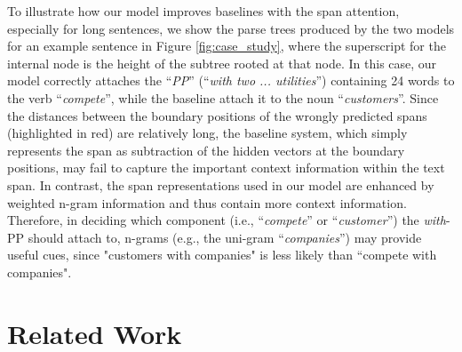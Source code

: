 \documentclass[11pt,a4paper]{article}
\begin{document}
To illustrate how our model improves baselines with the span attention, especially for long sentences, we show the parse trees produced by the two models for an example sentence in Figure \ref{fig:case_study}, where the superscript for the internal node is the height of the subtree rooted at that node.
In this case, our model correctly attaches the ``\textit{PP}'' (``\textit{with two ... utilities}'') containing 24 words to the verb ``\textit{compete}'', while the baseline attach it to the noun ``\textit{customers}''.
Since the distances between the boundary positions of the wrongly predicted spans (highlighted in red) are relatively long, the baseline system, which simply represents the span as subtraction of the hidden vectors at the boundary positions, may fail to capture the important context information within the text span.   
In contrast, the span representations used in our model are enhanced by weighted n-gram information and thus contain more context information.
Therefore, in deciding which component (i.e., ``\textit{compete}'' or ``\textit{customer}'')  the \textit{with}-PP 
should attach to, n-grams (e.g., the uni-gram ``\textit{companies}'') may provide useful cues, since "customers with companies" is less likely than ``compete with companies".




\section{Related Work}
\end{document}
